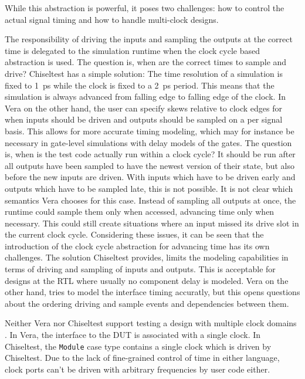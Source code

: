 \documentclass[11pt,a4paper]{report}
\newcommand{\ttt}{\texttt}
\begin{document}
While this abstraction is powerful, it poses two challenges: how to control the actual signal timing and how to
handle multi-clock designs.

The responsibility of driving the inputs and sampling the outputs at the correct time is delegated to the simulation
runtime when the clock cycle based abstraction is used. The question is, when are the correct times to sample and
drive? Chiseltest has a simple solution: The time resolution of a simulation is fixed to \SI{1}{ps} while the clock
is fixed to a \SI{2}{ps} period. This means that the simulation is always advanced from falling edge to falling edge
of the clock. In Vera on the other hand, the user can specify skews relative to clock edges for when inputs should be
driven and outputs should be sampled on a per signal basis. This allows for more accurate timing modeling, which may
for instance be necessary in gate-level simulations with delay models of the gates. The question is, when is the test
code actually run within a clock cycle? It should be run after all outputs have been sampled to have the newest
version of their state, but also before the new inputs are driven. With inputs which have to be driven early and
outputs which have to be sampled late, this is not possible. It is not clear which semantics Vera chooses for this
case. Instead of sampling all outputs at once, the runtime could sample them only when accessed, advancing time only
when necessary. This could still create situations where an input missed its drive slot in the current clock cycle.
Considering these issues, it can be seen that the introduction of the clock cycle abstraction for advancing time has
its own challenges. The solution Chiseltest provides, limits the modeling capabilities in terms of driving and
sampling of inputs and outputs. This is acceptable for designs at the RTL where usually no component delay is
modeled. Vera on the other hand, tries to model the interface timing accuratly, but this opens questions about the
ordering driving and sample events and dependencies between them.

Neither Vera nor Chiseltest support testing a design with multiple clock domains \cite[Sec.
7]{flake2020a}\cite{chiseltest_multiclock}. In Vera, the interface to the DUT is associated with a single clock. In
Chiseltest, the \ttt{Module} case type contains a single clock which is driven by Chiseltest. Due to the lack of
fine-grained control of time in either language, clock ports can't be driven with arbitrary frequencies by user code either.
\end{document}
